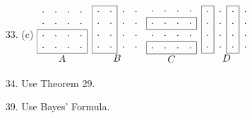 \begin{enumerate}
	\item[33.] (c) $\begin{array}{|cccc|}
	\multicolumn{1}{c}{\cdot} & \cdot & \cdot &\multicolumn{1}{c}{\cdot} \\ 
	\multicolumn{1}{c}{\cdot} & \cdot & \cdot & \multicolumn{1}{c}{\cdot} \\ \hline
	\cdot & \cdot & \cdot & \cdot \\ 
	\cdot & \cdot & \cdot & \cdot \\ \hline 
	\multicolumn{4}{c}{A}
	\end{array}$ \;
	$\begin{array}{|cc|cc} \cline{1-2}
	\cdot & \cdot & \cdot & \cdot \\ 
	\cdot & \cdot & \cdot & \cdot \\ 
	\cdot & \cdot & \cdot & \cdot \\ 
	\cdot & \cdot & \cdot & \cdot \\ \cline{1-2} 
	\multicolumn{4}{c}{B}
	\end{array}$ \;
	$\begin{array}{|cccc|} 
	\multicolumn{1}{c}{\cdot} & \cdot & \cdot &\multicolumn{1}{c}{\cdot} \\ \hline 
	\cdot & \cdot & \cdot & \cdot \\ \hline 
	\multicolumn{1}{c}{\cdot} & \cdot & \cdot & \multicolumn{1}{c}{\cdot} \\ \hline 
	\cdot & \cdot & \cdot & \cdot \\ \hline
	\multicolumn{4}{c}{C}
	\end{array}$ \;
	$\begin{array}{|c|c|c|c} \cline{1-1}\cline{3-3}
	\cdot & \cdot & \cdot & \cdot \\ 
	\cdot & \cdot & \cdot & \cdot \\ 
	\cdot & \cdot & \cdot & \cdot \\ 
	\cdot & \cdot & \cdot & \cdot \\ \cline{1-1}\cline{3-3}
	\multicolumn{4}{c}{D}
	\end{array}$ \;
	
	\item[34.] Use Theorem 29.
	
	\item[39.] Use Bayes' Formula.
	

\end{enumerate}
